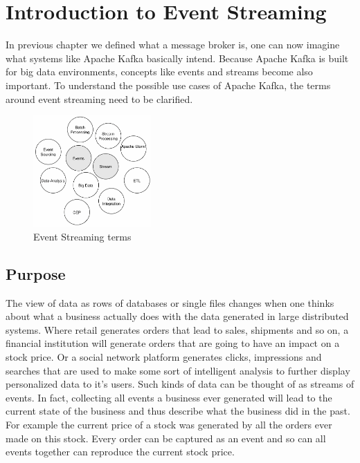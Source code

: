 \chapter{Introduction to Event Streaming}
\label{chap:event-streaming}

In previous chapter we defined what a message broker is, one can now imagine
what systems like Apache Kafka basically intend. Because Apache Kafka is built
for big data environments, concepts like events and streams become also important. To
understand the possible use cases of Apache Kafka, the terms around event
streaming need to be clarified.

\begin{figure}[H]
    \centering
    \includegraphics[width=0.4\textwidth]{images/evenstreaming-intro.png}
    \caption{Event Streaming terms}
    \label{fig:evenstreaming-intro}
\end{figure}

\section{Purpose}
The view of data as rows of databases or single files changes when one thinks
about what a business actually does with the data generated in large distributed
systems. Where retail generates orders that lead to sales, shipments and so on,
a financial institution will generate orders that are going to have an impact on
a stock price. Or a social network platform generates clicks, impressions and
searches that are used to make some sort of intelligent analysis to further
display personalized data to it's users. Such kinds of data can be thought of as
streams of events. In fact, collecting all events a business ever generated will
lead to the current state of the business and thus describe what the business
did in the past. For example the current price of a stock was generated by all
the orders ever made on this stock. Every order can be captured as an event and
so can all events together can reproduce the current stock price.

